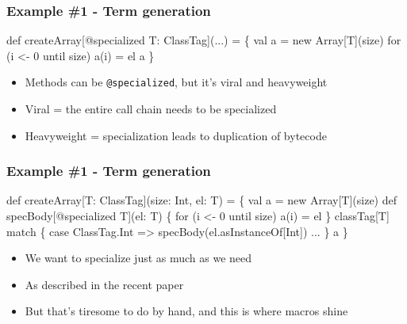 \documentclass[svgnames,hyperref={bookmarks=false}]{beamer}
\begin{document}
\begin{frame}[fragile]
\frametitle{Example \#1 - Term generation}

\begin{semiverbatim}
def createArray[@specialized T: ClassTag](...) = \{
  val a = new Array[T](size)
  for (i <- 0 until size) a(i) = el
  a
\}

\end{semiverbatim}

\begin{itemize}
\item Methods can be \texttt{@specialized}, but it's viral and heavyweight
\item Viral = the entire call chain needs to be specialized
\item Heavyweight = specialization leads to duplication of bytecode
\end{itemize}
\end{frame}

\begin{frame}[fragile]
\frametitle{Example \#1 - Term generation}

\begin{semiverbatim}
def createArray[T: ClassTag](size: Int, el: T) = \{
  val a = new Array[T](size)
  def specBody[@specialized T](el: T) \{
    for (i <- 0 until size) a(i) = el
  \}
  classTag[T] match \{
    case ClassTag.Int => specBody(el.asInstanceOf[Int])
    ...
  \}
  a
\}
\end{semiverbatim}

\begin{itemize}
\item We want to specialize just as much as we need
\item As described in the recent  paper
\item But that's tiresome to do by hand, and this is where macros shine
\end{itemize}
\end{frame}
\end{document}
